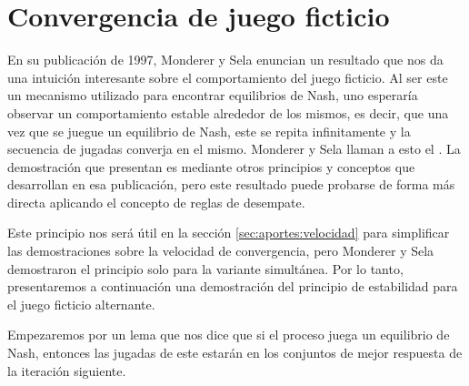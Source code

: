 \section{Convergencia de juego ficticio} \label{sec:convergencia:fp}

En su publicación de 1997, Monderer y Sela \cite{no:cycling} enuncian un resultado que nos da una intuición interesante sobre el comportamiento del juego ficticio. Al ser este un mecanismo utilizado para encontrar equilibrios de Nash, uno esperaría observar un comportamiento estable alrededor de los mismos, es decir, que una vez que se juegue un equilibrio de Nash, este se repita infinitamente y la secuencia de jugadas converja en el mismo. Monderer y Sela llaman a esto el . La demostración que presentan es mediante otros principios y conceptos que desarrollan en esa publicación, pero este resultado puede probarse de forma más directa aplicando el concepto de reglas de desempate.

Este principio nos será útil en la sección \ref{sec:aportes:velocidad} para simplificar las demostraciones sobre la velocidad de convergencia, pero Monderer y Sela demostraron el principio solo para la variante simultánea. Por lo tanto, presentaremos a continuación una demostración del principio de estabilidad para el juego ficticio alternante.

Empezaremos por un lema que nos dice que si el proceso juega un equilibrio de Nash, entonces las jugadas de este estarán en los conjuntos de mejor respuesta de la iteración siguiente. 

